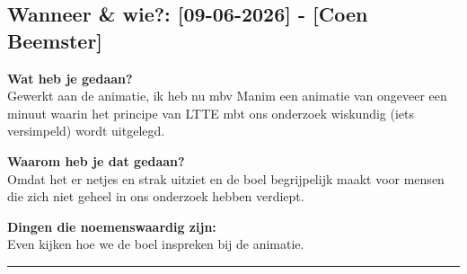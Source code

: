 
\subsection*{Wanneer \& wie?: [09-06-2026] - [Coen Beemster]}

\textbf{Wat heb je gedaan?}\\
Gewerkt aan de animatie, ik heb nu mbv Manim een animatie van ongeveer een minuut waarin het principe van LTTE mbt ons onderzoek wiskundig (iets versimpeld) wordt uitgelegd.
\vspace{0.3cm} 

\noindent \textbf{Waarom heb je dat gedaan?}\\
Omdat het er netjes en strak uitziet en de boel begrijpelijk maakt voor mensen die zich niet geheel in ons onderzoek hebben verdiept.

\noindent \textbf{Dingen die noemenswaardig zijn:}\\
Even kijken hoe we de boel inspreken bij de animatie.


\vspace{0.5cm}
\hrule 
\vspace{0.5cm}
